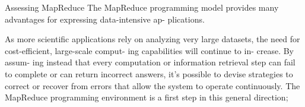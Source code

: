 Assessing MapReduce
The MapReduce programming model provides many advantages for expressing data-intensive ap- plications.

As more scientific applications rely on analyzing very large datasets, the need for cost-efficient, large-scale comput- ing capabilities will continue to in- crease. 
 By assum- ing instead that every computation or information retrieval step can fail to complete or can return incorrect answers, it’s possible to devise strategies to correct or recover from errors that allow the system to operate continuously.
 The MapReduce programming environment is a first step in this general direction; 